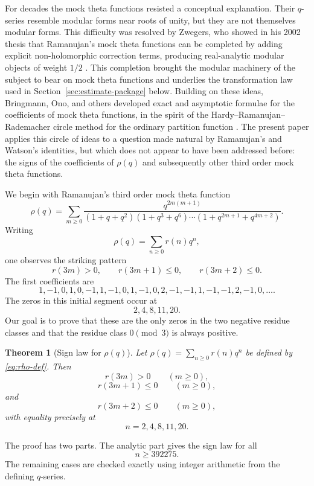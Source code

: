 \documentclass[11pt]{article}
\newtheorem{theorem}{Theorem}[section]
\theoremstyle{remark}
\begin{document}
For decades the mock theta functions resisted a conceptual explanation.  Their $q$-series resemble modular forms near roots of unity, but they are not themselves modular forms.  This difficulty was resolved by Zwegers, who showed in his 2002 thesis that Ramanujan's mock theta functions can be completed by adding explicit non-holomorphic correction terms, producing real-analytic modular objects of weight $1/2$ \cite{ZwegersThesis}.  This completion brought the modular machinery of the subject to bear on mock theta functions and underlies the transformation law used in Section~\ref{sec:estimate-package} below.  Building on these ideas, Bringmann, Ono, and others developed exact and asymptotic formulae for the coefficients of mock theta functions, in the spirit of the Hardy--Ramanujan--Rademacher circle method for the ordinary partition function \cite{BringmannOno,BringmannOnoCoeff,Folsom}.  The present paper applies this circle of ideas to a question made natural by Ramanujan's and Watson's identities, but which does not appear to have been addressed before: the signs of the coefficients of $\rho(q)$ and subsequently other third order mock theta functions.

We begin with Ramanujan's third order mock theta function
\begin{equation}\label{eq:rho-def}
\rho(q)=\sum_{m\geq 0}\frac{q^{2m(m+1)}}{(1+q+q^2)(1+q^3+q^6)\cdots(1+q^{2m+1}+q^{4m+2})}.
\end{equation}
Writing
\[
\rho(q)=\sum_{n\geq 0}r(n)q^n,
\]
one observes the striking pattern
\[
r(3m)>0,
\qquad
r(3m+1)\leq 0,
\qquad
r(3m+2)\leq 0.
\]
The first coefficients are
\[
1,-1,0,1,0,-1,1,-1,0,1,-1,0,2,-1,-1,1,-1,-1,2,-1,0,\ldots .
\]
The zeros in this initial segment occur at
\[
2,4,8,11,20.
\]
Our goal is to prove that these are the only zeros in the two negative residue classes and that the residue class $0\pmod 3$ is always positive.

\begin{theorem}[Sign law for $\rho(q)$]\label{thm:main}
Let $\rho(q)=\sum_{n\geq0}r(n)q^n$ be defined by \eqref{eq:rho-def}. Then
\[
r(3m)>0\qquad(m\geq0),
\]
\[
r(3m+1)\leq 0\qquad(m\geq0),
\]
and
\[
r(3m+2)\leq 0\qquad(m\geq0),
\]
with equality precisely at
\[
n=2,4,8,11,20.
\]
\end{theorem}

The proof has two parts. The analytic part gives the sign law for all
\[
n\geq 392275.
\]
The remaining cases are checked exactly using integer arithmetic from the defining $q$-series.
\end{document}
